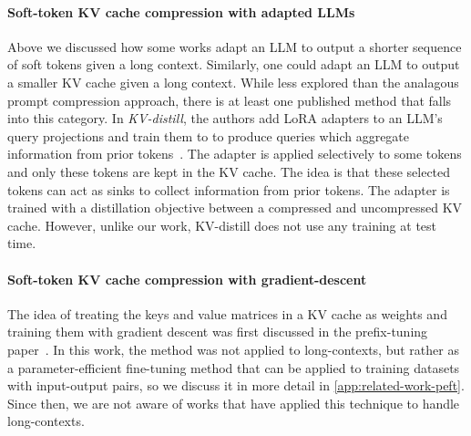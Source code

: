 \paragraph{Soft-token KV cache compression with adapted LLMs}
Above we discussed how some works adapt an LLM to output a shorter sequence of soft tokens given a long context. Similarly, one could adapt an LLM to output a smaller KV cache given a long context. While less explored than the analagous prompt compression approach, there is at least one published method that falls into this category.
In \textit{KV-distill}, the authors add LoRA adapters to an LLM's query projections and train them to to produce queries which aggregate information from prior tokens~\cite{chari2025kv}.
The adapter is applied selectively to some tokens and only these tokens are kept in the KV cache.
The idea is that these selected tokens can act as sinks to collect information from prior tokens.
The adapter is trained with a distillation objective between a compressed and uncompressed KV cache. However, unlike our work, KV-distill does not use any training at test time.
\paragraph{Soft-token KV cache compression with gradient-descent} The idea of treating the keys and value matrices in a KV cache as weights and training them with gradient descent was first discussed in the prefix-tuning paper~\cite{li2021prefix}.
In this work, the method was not applied to long-contexts, but rather as a parameter-efficient fine-tuning method that can be applied to training datasets with input-output pairs, so we discuss it in more detail in \ref{app:related-work-peft}.
Since then, we are not aware of works that have applied this technique to handle long-contexts.
